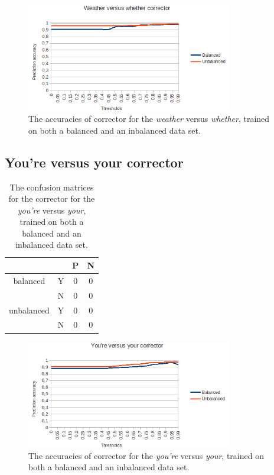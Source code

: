 \documentclass[12pt]{article}
\begin{document}
\begin{figure}[H]
\centering
\includegraphics[width=0.8\textwidth]{accuracy_weatherwhether.png}
\caption{The accuracies of corrector for the \emph{weather} versus \emph{whether}, trained on both a balanced and an inbalanced data set.}
\end{figure}

\subsection{You're versus your corrector}

\begin{table}[H] \footnotesize
\centering
\begin{tabular}{|c|c|c|c|}
\hline
&&P&N\\
\hline
balanced&Y&0&0\\
&N&0&0\\
\hline
\hline
unbalanced&Y&0&0\\
&N&0&0\\
\hline
\end{tabular}
\caption{The confusion matrices for the corrector for the \emph{you're} versus \emph{your}, trained on both a balanced and an inbalanced data set.}
\end{table}

\begin{figure}[H]
\centering
\includegraphics[width=0.8\textwidth]{accuracy_you'reyour.png}
\caption{The accuracies of corrector for the \emph{you're} versus \emph{your}, trained on both a balanced and an inbalanced data set.}
\end{figure}
\end{document}
